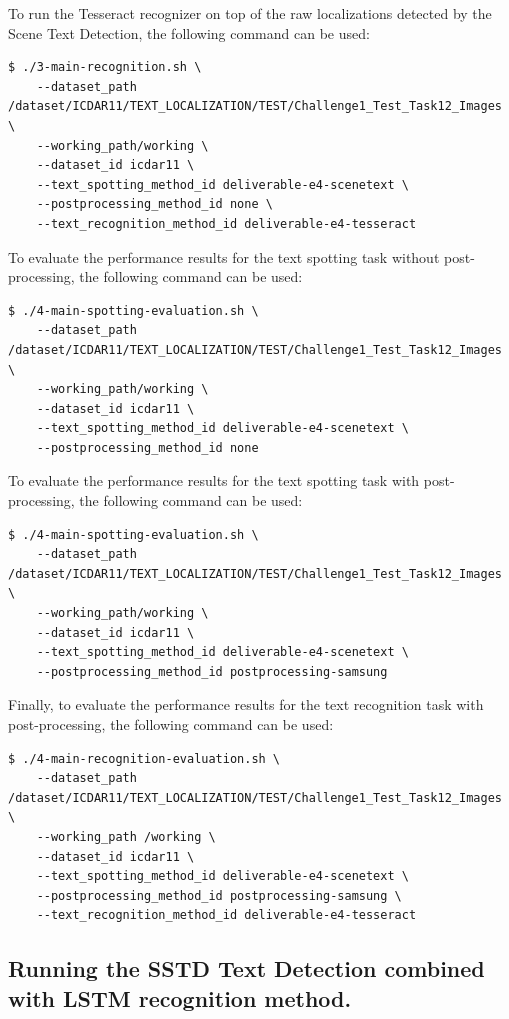 To run the Tesseract recognizer on top of the raw localizations detected by the Scene Text Detection, the following command can be used:
\begin{lstlisting}[style=fancyterminal]
 $ ./3-main-recognition.sh \
    --dataset_path /dataset/ICDAR11/TEXT_LOCALIZATION/TEST/Challenge1_Test_Task12_Images \
    --working_path/working \
    --dataset_id icdar11 \
    --text_spotting_method_id deliverable-e4-scenetext \
    --postprocessing_method_id none \
    --text_recognition_method_id deliverable-e4-tesseract
\end{lstlisting}

To evaluate the performance results for the text spotting task without post-processing, the following command can be used:
\begin{lstlisting}[style=fancyterminal]
 $ ./4-main-spotting-evaluation.sh \
    --dataset_path /dataset/ICDAR11/TEXT_LOCALIZATION/TEST/Challenge1_Test_Task12_Images \
    --working_path/working \
    --dataset_id icdar11 \
    --text_spotting_method_id deliverable-e4-scenetext \
    --postprocessing_method_id none
\end{lstlisting}

To evaluate the performance results for the text spotting task with post-processing, the following command can be used:
\begin{lstlisting}[style=fancyterminal]
 $ ./4-main-spotting-evaluation.sh \
    --dataset_path /dataset/ICDAR11/TEXT_LOCALIZATION/TEST/Challenge1_Test_Task12_Images \
    --working_path/working \
    --dataset_id icdar11 \
    --text_spotting_method_id deliverable-e4-scenetext \
    --postprocessing_method_id postprocessing-samsung
\end{lstlisting}

Finally, to evaluate the performance results for the text recognition task with post-processing, the following command can be used:
\begin{lstlisting}[style=fancyterminal]
 $ ./4-main-recognition-evaluation.sh \
    --dataset_path /dataset/ICDAR11/TEXT_LOCALIZATION/TEST/Challenge1_Test_Task12_Images \
    --working_path /working \
    --dataset_id icdar11 \
    --text_spotting_method_id deliverable-e4-scenetext \
    --postprocessing_method_id postprocessing-samsung \
    --text_recognition_method_id deliverable-e4-tesseract
\end{lstlisting}


\subsection{Running the SSTD Text Detection combined with LSTM recognition method.}

